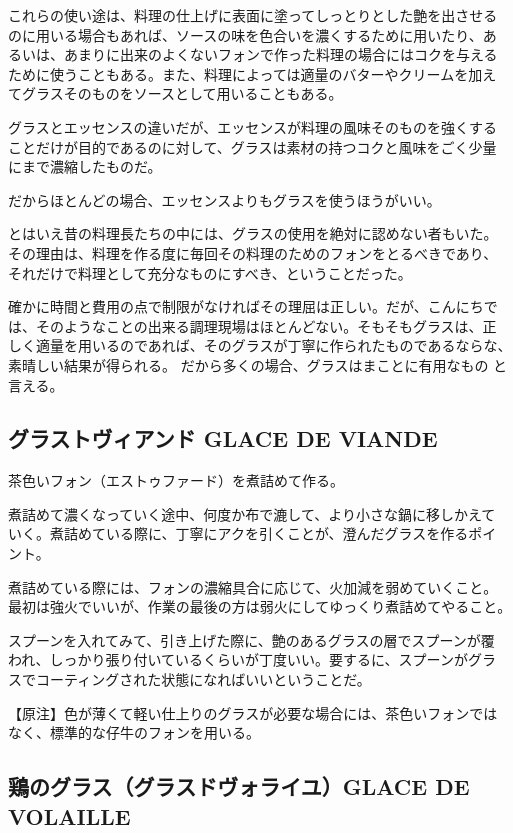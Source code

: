 \documentclass[twoside,12Q,b5paper]{escoffierltjsbook}
\newenvironment{recette}{\begin{multicols}{2}}{\end{multicols}}
\begin{document}
\begin{recette}
これらの使い途は、料理の仕上げに表面に塗ってしっとりとした艶を出させる
のに用いる場合もあれば、ソースの味を色合いを濃くするために用いたり、あ
るいは、あまりに出来のよくないフォンで作った料理の場合にはコクを与える
ために使うこともある。また、料理によっては適量のバターやクリームを加え
てグラスそのものをソースとして用いることもある。

グラスとエッセンスの違いだが、エッセンスが料理の風味そのものを強くする
ことだけが目的であるのに対して、グラスは素材の持つコクと風味をごく少量
にまで濃縮したものだ。

だからほとんどの場合、エッセンスよりもグラスを使うほうがいい。

とはいえ昔の料理長たちの中には、グラスの使用を絶対に認めない者もいた。
その理由は、料理を作る度に毎回その料理のためのフォンをとるべきであり、
それだけで料理として充分なものにすべき、ということだった。

確かに時間と費用の点で制限がなければその理屈は正しい。だが、こんにちで
は、そのようなことの出来る調理現場はほとんどない。そもそもグラスは、正
しく適量を用いるのであれば、そのグラスが丁寧に作られたものであるならな、
素晴しい結果が得られる。 だから多くの場合、グラスはまことに有用なもの
と言える。

\subsection{グラストヴィアンド GLACE DE
VIANDE}\label{ux30b0ux30e9ux30b9ux30c8ux30f4ux30a3ux30a2ux30f3ux30c9-glace-de-viande}

茶色いフォン（エストゥファード）を煮詰めて作る。

煮詰めて濃くなっていく途中、何度か布で漉して、より小さな鍋に移しかえて
いく。煮詰めている際に、丁寧にアクを引くことが、澄んだグラスを作るポイ
ント。

煮詰めている際には、フォンの濃縮具合に応じて、火加減を弱めていくこと。
最初は強火でいいが、作業の最後の方は弱火にしてゆっくり煮詰めてやること。

スプーンを入れてみて、引き上げた際に、艶のあるグラスの層でスプーンが覆
われ、しっかり張り付いているくらいが丁度いい。要するに、スプーンがグラ
スでコーティングされた状態になればいいということだ。

【原注】色が薄くて軽い仕上りのグラスが必要な場合には、茶色いフォンでは
なく、標準的な仔牛のフォンを用いる。

\subsection{鶏のグラス（グラスドヴォライユ）GLACE DE
VOLAILLE}\label{ux9d8fux306eux30b0ux30e9ux30b9ux30b0ux30e9ux30b9ux30c9ux30f4ux30a9ux30e9ux30a4ux30e6glace-de-volaille}


\end{recette}
\end{document}
